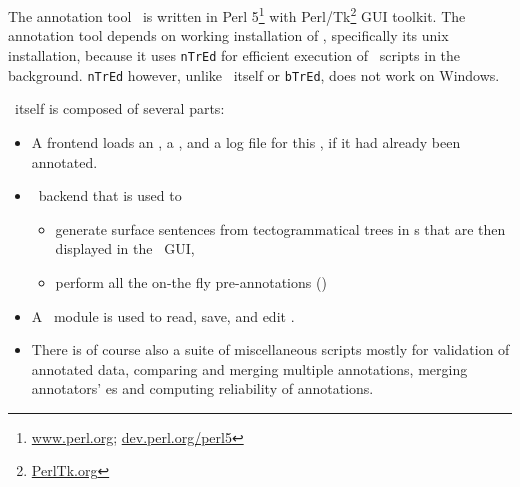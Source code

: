 
\chapter{\seman}
\label{sec:seman}
The annotation tool \seman\ is written in Perl 5\footnote{\url{www.perl.org}; \url{dev.perl.org/perl5}} with Perl/Tk\footnote{\url{PerlTk.org}} GUI toolkit. The annotation tool depends on working installation of \tred, specifically its unix installation, because it uses \texttt{nTrEd} for efficient execution of \tred\ scripts in the background. \texttt{nTrEd} however, unlike \tred\ itself or \texttt{bTrEd}, does not work on Windows.%

 \seman\ itself is composed of several parts:
\begin{itemize}
  \item A frontend loads an \sf, a \semlex,  and a log file for this \sf, if it had already been annotated. 
  \item \ntred\ backend that is used to 
	\begin{itemize}
	  \item generate surface sentences from tectogrammatical trees in \tf{}s that are then displayed in the \seman\ GUI,
	  \item perform all the on-the fly pre-annotations ()
	\end{itemize}
  \item A \semlex\ module is used to read, save, and edit \semlex.
  \item There is of course also a suite of miscellaneous scripts mostly for validation of annotated data, comparing and merging multiple annotations, merging annotators' \semlex{}es and computing reliability of annotations.
\end{itemize}

